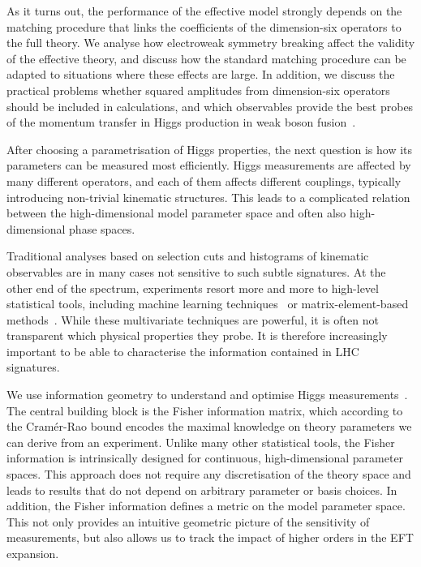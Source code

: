 As it turns out, the performance of the effective model strongly
depends on the matching procedure that links the coefficients of the
dimension-six operators to the full theory. We analyse how electroweak
symmetry breaking affect the validity of the effective theory, and
discuss how the standard matching procedure can be adapted to
situations where these effects are large. In addition, we discuss the
practical problems whether squared amplitudes from dimension-six
operators should be included in calculations, and which observables
provide the best probes of the momentum transfer in Higgs production
in weak boson fusion~\cite{Biekotter:2016ecg}.

\newparagraph
%
After choosing a parametrisation of Higgs properties, the next
question is how its parameters can be measured most efficiently. Higgs
measurements are affected by many different operators, and each of
them affects different couplings, typically introducing non-trivial
kinematic structures. This leads to a complicated relation between the
high-dimensional model parameter space and often also high-dimensional
phase spaces.

Traditional analyses based on selection cuts and histograms of
kinematic observables are in many cases not sensitive to such subtle
signatures.  At the other end of the spectrum, experiments resort more
and more to high-level statistical tools, including machine learning
techniques~\cite{Cranmer:2015bka, Louppe:2016ylz, Louppe:2016aov,
  Cranmer:2016lzt, Baldi:2016fzo, Brehmer:ghost_probability,
  Cogan:2014oua, Baldi:2014pta, deOliveira:2015xxd, Almeida:2015jua,
  Baldi:2016fql, Guest:2016iqz, Komiske:2016rsd, Kasieczka:2017nvn,
  Louppe:2017ipp, Baldi:2014kfa, Searcy:2015apa, Santos:2016kno,
  Alves:2016htj, Buckley:2011kc, Bornhauser:2013aya, Bechtle:2017vyu}
or matrix-element-based methods~\cite{Kondo:1988yd, Abazov:2004cs,
  Gao:2010qx, Alwall:2010cq, Avery:2012um, Andersen:2012kn,
  Campbell:2013hz, Artoisenet:2013vfa, Martini:2015fsa,
  Gritsan:2016hjl, Soper:2011cr, Soper:2012pb, Soper:2014rya,
  Atwood:1991ka, Davier:1992nw, Diehl:1993br}. While these
multivariate techniques are powerful, it is often not transparent
which physical properties they probe. It is therefore increasingly
important to be able to characterise the information contained in LHC
signatures.

We use information geometry to understand and optimise Higgs
measurements~\cite{Brehmer:2016nyr}.  The central building block is
the Fisher information matrix, which according to the Cram\'er-Rao
bound encodes the maximal knowledge on theory parameters we can derive
from an experiment. Unlike many other statistical tools, the Fisher
information is intrinsically designed for continuous, high-dimensional
parameter spaces. This approach does not require any discretisation of
the theory space and leads to results that do not depend on arbitrary
parameter or basis choices. In addition, the Fisher information
defines a metric on the model parameter space. This not only provides
an intuitive geometric picture of the sensitivity of measurements, but
also allows us to track the impact of higher orders in the EFT
expansion.

